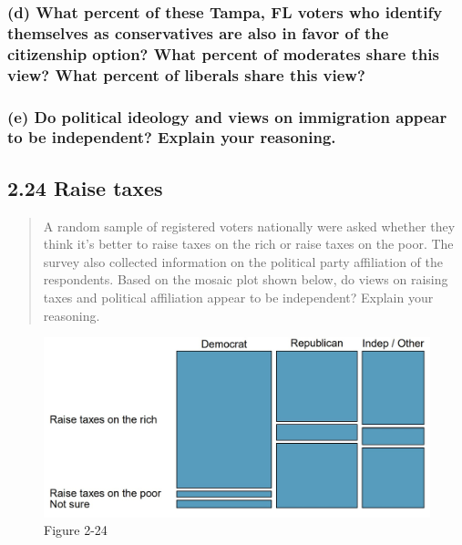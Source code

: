 \documentclass[
]{article}
\begin{document}
\subsubsection{(d) What percent of these Tampa, FL voters who identify
themselves as conservatives are also in favor of the citizenship option?
What percent of moderates share this view? What percent of liberals
share this
view?}\label{d-what-percent-of-these-tampa-fl-voters-who-identify-themselves-as-conservatives-are-also-in-favor-of-the-citizenship-option-what-percent-of-moderates-share-this-view-what-percent-of-liberals-share-this-view}

\subsubsection{(e) Do political ideology and views on immigration appear
to be independent? Explain your
reasoning.}\label{e-do-political-ideology-and-views-on-immigration-appear-to-be-independent-explain-your-reasoning.}

\subsection{2.24 Raise taxes}\label{raise-taxes}

\begin{quote}
A random sample of registered voters nationally were asked whether they
think it's better to raise taxes on the rich or raise taxes on the poor.
The survey also collected information on the political party affiliation
of the respondents. Based on the mosaic plot shown below, do views on
raising taxes and political affiliation appear to be independent?
Explain your reasoning.
\end{quote}

\begin{figure}
\centering
\includegraphics{./assets/2-24.jpg}
\caption{Figure 2-24}
\end{figure}
\end{document}
